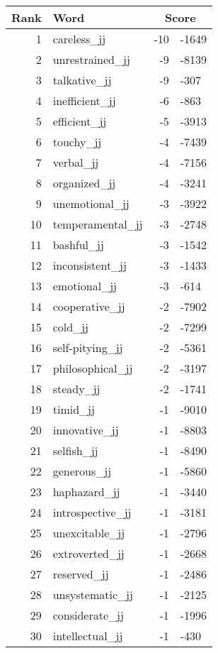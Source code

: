 \begin{longtable}[!htbp]{| rlr@{.}l |}
    \hline
    \textbf{Rank} & \textbf{Word} & \multicolumn{2}{c|}{\textbf{Score}} \\
    \hline
    \endhead
    1 & careless\_jj & -10 & -1649 \\
    2 & unrestrained\_jj & -9 & -8139 \\
    3 & talkative\_jj & -9 & -307 \\
    4 & inefficient\_jj & -6 & -863 \\
    5 & efficient\_jj & -5 & -3913 \\
    6 & touchy\_jj & -4 & -7439 \\
    7 & verbal\_jj & -4 & -7156 \\
    8 & organized\_jj & -4 & -3241 \\
    9 & unemotional\_jj & -3 & -3922 \\
    10 & temperamental\_jj & -3 & -2748 \\
    11 & bashful\_jj & -3 & -1542 \\
    12 & inconsistent\_jj & -3 & -1433 \\
    13 & emotional\_jj & -3 & -614 \\
    14 & cooperative\_jj & -2 & -7902 \\
    15 & cold\_jj & -2 & -7299 \\
    16 & self-pitying\_jj & -2 & -5361 \\
    17 & philosophical\_jj & -2 & -3197 \\
    18 & steady\_jj & -2 & -1741 \\
    19 & timid\_jj & -1 & -9010 \\
    20 & innovative\_jj & -1 & -8803 \\
    21 & selfish\_jj & -1 & -8490 \\
    22 & generous\_jj & -1 & -5860 \\
    23 & haphazard\_jj & -1 & -3440 \\
    24 & introspective\_jj & -1 & -3181 \\
    25 & unexcitable\_jj & -1 & -2796 \\
    26 & extroverted\_jj & -1 & -2668 \\
    27 & reserved\_jj & -1 & -2486 \\
    28 & unsystematic\_jj & -1 & -2125 \\
    29 & considerate\_jj & -1 & -1996 \\
    30 & intellectual\_jj & -1 & -430 \\

\end{longtable}

